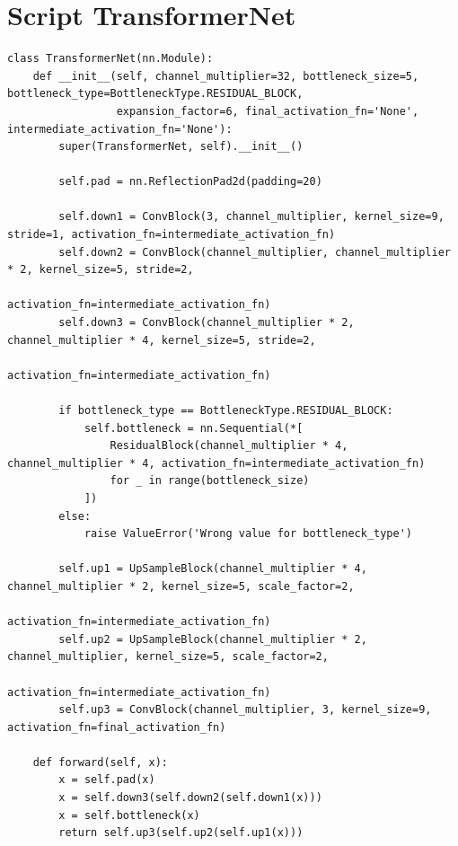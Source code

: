 \section{Script TransformerNet}
\label{sec:script_transformer_net}
\begin{longlisting}
\begin{verbatim}
class TransformerNet(nn.Module):
    def __init__(self, channel_multiplier=32, bottleneck_size=5, bottleneck_type=BottleneckType.RESIDUAL_BLOCK,
                 expansion_factor=6, final_activation_fn='None', intermediate_activation_fn='None'):
        super(TransformerNet, self).__init__()

        self.pad = nn.ReflectionPad2d(padding=20)

        self.down1 = ConvBlock(3, channel_multiplier, kernel_size=9, stride=1, activation_fn=intermediate_activation_fn)
        self.down2 = ConvBlock(channel_multiplier, channel_multiplier * 2, kernel_size=5, stride=2,
                               activation_fn=intermediate_activation_fn)
        self.down3 = ConvBlock(channel_multiplier * 2, channel_multiplier * 4, kernel_size=5, stride=2,
                               activation_fn=intermediate_activation_fn)

        if bottleneck_type == BottleneckType.RESIDUAL_BLOCK:
            self.bottleneck = nn.Sequential(*[
                ResidualBlock(channel_multiplier * 4, channel_multiplier * 4, activation_fn=intermediate_activation_fn)
                for _ in range(bottleneck_size)
            ])
        else:
            raise ValueError('Wrong value for bottleneck_type')

        self.up1 = UpSampleBlock(channel_multiplier * 4, channel_multiplier * 2, kernel_size=5, scale_factor=2,
                                 activation_fn=intermediate_activation_fn)
        self.up2 = UpSampleBlock(channel_multiplier * 2, channel_multiplier, kernel_size=5, scale_factor=2,
                                 activation_fn=intermediate_activation_fn)
        self.up3 = ConvBlock(channel_multiplier, 3, kernel_size=9, activation_fn=final_activation_fn)

    def forward(self, x):
        x = self.pad(x)
        x = self.down3(self.down2(self.down1(x)))
        x = self.bottleneck(x)
        return self.up3(self.up2(self.up1(x)))
\end{verbatim}
\label{lst:script_transformer_net}
\end{longlisting}

